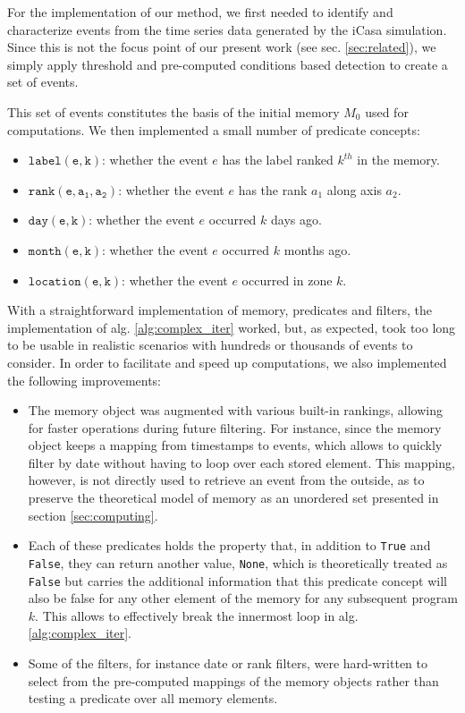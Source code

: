 \documentclass[conference]{IEEEtran}
\begin{document}
For the implementation of our method, we first needed to identify and
characterize events from the time series data generated by the iCasa simulation.
Since this is not the focus point of our present work (see sec.
\ref{sec:related}), we simply apply threshold and pre-computed conditions based
detection to create a set of events.

This set of events constitutes the basis of the initial memory $M_0$ used
for computations.
We then implemented a small number of predicate concepts:
\begin{itemize}
  \item $\mathtt{label(e, k)}$: whether the event $e$ has the label ranked
        $k^{th}$ in the memory.
  \item $\mathtt{rank(e, a_1, a_2)}$: whether the event $e$ has the rank $a_1$
        along axis $a_2$.
  \item $\mathtt{day(e, k)}$: whether the event $e$ occurred $k$ days ago.
  \item $\mathtt{month(e, k)}$: whether the event $e$ occurred $k$ months
        ago.
  \item $\mathtt{location(e, k)}$: whether the event $e$ occurred in zone
        $k$.
\end{itemize}

With a straightforward implementation of memory, predicates and filters, the
implementation of alg. \ref{alg:complex_iter} worked, but, as expected, took too
long to be usable in realistic scenarios with hundreds or thousands of events to
consider. In order to facilitate and speed up computations, we also implemented
the following improvements:
\begin{itemize}
  \item The memory object was augmented with various built-in rankings, allowing
        for faster operations during future filtering. For instance, since the memory
        object keeps a mapping from timestamps to events, which allows to quickly
        filter by date without having to loop over each stored element. This mapping,
        however, is not directly used to retrieve an event from the outside, as to
        preserve the theoretical model of memory as an unordered set presented in
        section \ref{sec:computing}.

  \item Each of these predicates holds the property that, in addition to
        \texttt{True} and \texttt{False}, they can return another value,
        \texttt{None}, which is theoretically treated as \texttt{False} but carries
        the additional information that this predicate concept will also be false for
        any other element of the memory for any subsequent program $k$. This allows to
        effectively break the innermost loop in alg. \ref{alg:complex_iter}.

  \item Some of the filters, for instance date or rank filters, were
        hard-written to select from the pre-computed mappings of the memory objects
        rather than testing a predicate over all memory elements.
\end{itemize}
\end{document}
